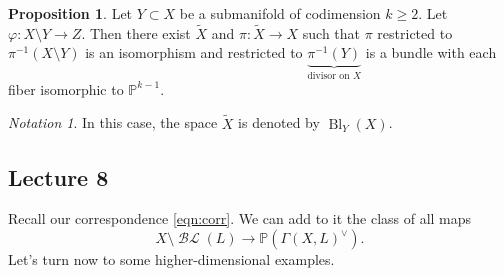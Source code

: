 \documentclass[10pt,letterpaper,cm]{nupset}
\theoremstyle{definition}
\theoremstyle{theorem}
\newtheorem{prop}[defn]{Proposition}
\theoremstyle{remark}
\newtheorem*{notation}{Notation}
\renewcommand{\P}{\mathbb P}
\newcommand{\1}{\mathbb{1}}
\newcommand{\0}{\vec 0}
\DeclareMathOperator{\BL}{\mathcal{BL}}
\DeclareMathOperator{\bl}{\mathrm{Bl}}
\begin{document}
\begin{prop}
Let $Y \subset X$ be a submanifold of codimension $k\geq 2$. Let $\varphi : X \setminus Y \to Z$. Then there exist $\widetilde{X}$ and $\pi : \widetilde{X}\to X$ such that $\pi$ restricted to $\pi^{-1}\left(X\setminus Y\right)$ is an isomorphism and restricted to $\underbrace{\pi^{-1}(Y)}_{\text{divisor on }X}$ is a bundle with each fiber isomorphic to $\P^{k-1}$.
\end{prop}

\begin{notation}
In this case, the space $\widetilde{X}$ is denoted by $\bl_Y(X)$.
\end{notation}

\subsection{Lecture 8}

Recall our correspondence \eqref{eqn:corr}. We can add to it the class of all maps $$X \setminus \BL(L) \to \P\left(\Gamma \left(X, L\right)^{\vee}\right).$$
Let's turn now to some higher-dimensional examples.
\end{document}
